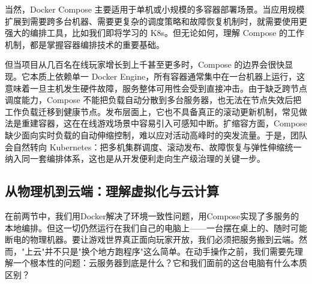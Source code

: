 当然，Docker Compose 主要适用于单机或小规模的多容器部署场景。当应用规模扩展到需要跨多台机器、需要更复杂的调度策略和故障恢复机制时，就需要使用更强大的编排工具，比如我们即将学习的 K8s。但无论如何，理解 Compose 的工作机制，都是掌握容器编排技术的重要基础。

但当项目从几百名在线玩家增长到上千甚至更多时，Compose 的边界会很快显现。它本质上依赖单一 Docker Engine，所有容器通常集中在一台机器上运行，这意味着一旦主机发生硬件故障，服务整体可用性会受到直接冲击。由于缺乏跨节点调度能力，Compose 不能把负载自动分散到多台服务器，也无法在节点失效后把工作负载迁移到健康节点。发布层面上，它也不具备真正的滚动更新机制，常见做法是重建容器，这在在线游戏场景中容易引入可感知中断。扩缩容方面，Compose 缺少面向实时负载的自动伸缩控制，难以应对活动高峰时的突发流量。于是，团队会自然转向 Kubernetes：把多机集群调度、滚动发布、故障恢复与弹性伸缩统一纳入同一套编排体系，这也是从开发便利走向生产级治理的关键一步。


\subsection{从物理机到云端：理解虚拟化与云计算}

在前两节中，我们用Docker解决了环境一致性问题，用Compose实现了多服务的本地编排。但这一切仍然运行在我们自己的电脑上——一台摆在桌上的、随时可能断电的物理机器。要让游戏世界真正面向玩家开放，我们必须把服务搬到云端。然而，"上云"并不只是"换个地方跑程序"这么简单。在动手操作之前，我们需要先理解一个根本性的问题：云服务器到底是什么？它和我们面前的这台电脑有什么本质区别？

